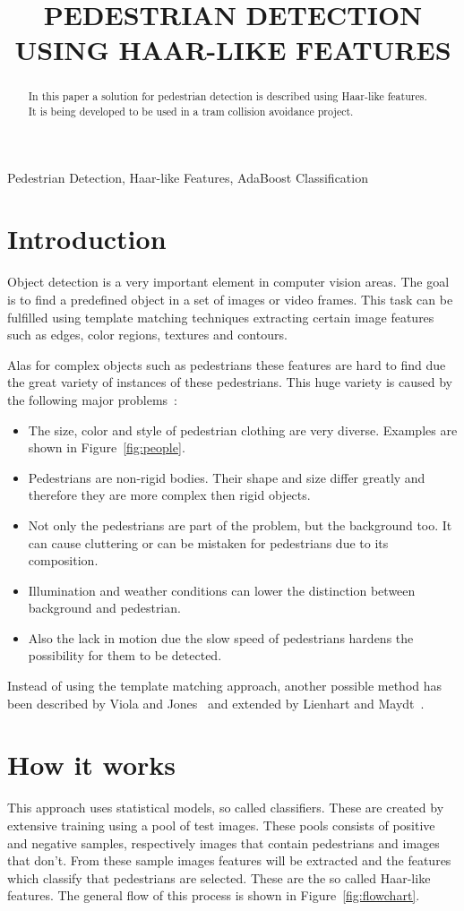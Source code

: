 \documentclass{article}
\title{PEDESTRIAN DETECTION USING HAAR-LIKE FEATURES}
\begin{document}
%
\maketitle
%
\begin{abstract}
In this paper a solution for pedestrian detection is described using Haar-like features. It is being developed to be used in a tram collision avoidance project. 
\end{abstract}
%
\begin{keywords}
Pedestrian Detection, Haar-like Features, AdaBoost Classification
\end{keywords}
%
\section{Introduction}
\label{sec:intro}
Object detection is a very important element in computer vision areas. The goal is to find a predefined object in a set of images or video frames. This task can be fulfilled using template matching techniques extracting certain image features such as edges, color regions, textures and contours.
\par
Alas for complex objects such as pedestrians these features are hard to find due the great variety of instances of these pedestrians. This huge variety is caused by the following major problems~\cite{monteiro2006vision}:
\begin{itemize}
\item The size, color and style of pedestrian clothing are very diverse. Examples are shown in Figure~\ref{fig:people}.
\item Pedestrians are non-rigid bodies. Their shape and size differ greatly and therefore they are more complex then rigid objects.
\item Not only the pedestrians are part of the problem, but the background too. It can cause cluttering or can be mistaken for pedestrians due to its composition.
\item Illumination and weather conditions can lower the distinction between background and pedestrian.
\item Also the lack in motion due the slow speed of pedestrians hardens the possibility for them to be detected.
\end{itemize}
Instead of using the template matching approach, another possible method has been described by Viola and Jones~\cite{viola2001rapid} and extended by Lienhart and Maydt~\cite{lienhart2002extended}.
\section{How it works}
This approach uses statistical models, so called classifiers. These are created by extensive training using a pool of test images. These pools consists of positive and negative samples, respectively images that contain pedestrians and images that don't. 
From these sample images features will be extracted and the features which classify that pedestrians are selected. These are the so called Haar-like features. The general flow of this process is shown in Figure~\ref{fig:flowchart}.
\end{document}
